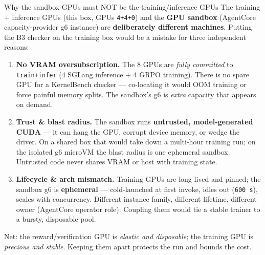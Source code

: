 \documentclass[aspectratio=169]{beamer}
\begin{document}
\begin{frame}{Why the sandbox GPUs must NOT be the training/inference GPUs}
  \footnotesize The training + inference GPUs (this box, GPUs \texttt{4+4+0}) and the \textbf{GPU
  sandbox} (AgentCore capacity-provider g6 instance) are \textbf{deliberately different machines}.
  Putting the B3 checker on the training box would be a mistake for three independent reasons:
  \vspace{0.3em}
  \begin{enumerate}\setlength\itemsep{0.5em}
    \item \textbf{No VRAM oversubscription.} The 8 GPUs are \emph{fully committed} to
      \texttt{train+infer} (4 SGLang inference + 4 GRPO training). There is no spare GPU for a
      KernelBench checker --- co-locating it would OOM training or force painful memory splits.
      The sandbox's g6 is \emph{extra} capacity that appears on demand.
    \item \textbf{Trust \& blast radius.} The sandbox runs \textbf{untrusted, model-generated CUDA} ---
      it can hang the GPU, corrupt device memory, or wedge the driver. On a shared box that would
      take down a multi-hour training run; on the isolated g6 microVM the blast radius is one
      ephemeral sandbox. Untrusted code never shares VRAM or host with training state.
    \item \textbf{Lifecycle \& arch mismatch.} Training GPUs are long-lived and pinned; the sandbox
      g6 is \textbf{ephemeral} --- cold-launched at first invoke, idles out (\texttt{600\,s}), scales
      with concurrency. Different instance family, different lifetime, different owner (AgentCore
      operator role). Coupling them would tie a stable trainer to a bursty, disposable pool.
  \end{enumerate}
  \vspace{0.2em}
  {\scriptsize Net: the reward/verification GPU is \emph{elastic and disposable}; the training GPU is
  \emph{precious and stable}. Keeping them apart protects the run and bounds the cost.}
\end{frame}
\end{document}
